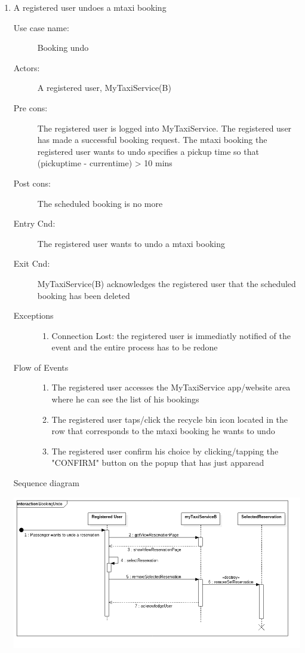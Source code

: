 \documentclass[11pt,titlepage]{article} %
\begin{document}
\begin{enumerate}
	
	       \item A registered user undoes a mtaxi booking
		\begin{description}
		        \item [Use case name:] Booking undo
		        \item [Actors:] A registered user, MyTaxiService(B)
		        \item [Pre cons:] The registered user is logged into MyTaxiService. The registered user
		        has made a successful booking request. The mtaxi booking the registered user wants to undo
		        specifies a pickup time so that (pickuptime - currentime) > 10 mins
		        \item [Post cons:] The scheduled booking is no more
		        \item [Entry Cnd:] The registered user wants to undo a mtaxi booking
		        \item [Exit Cnd:] MyTaxiService(B) acknowledges the registered user that the scheduled booking
		        has been deleted
		        \item [Exceptions]\hfill
			\begin{enumerate}
			          \item Connection Lost: the registered user is immediatly notified of the event and the entire process
			          has to be redone
			\end{enumerate}
		        \item [Flow of Events]\hfill
			\begin{enumerate}
			          \item The registered user accesses the MyTaxiService app/website area where he can see the list of his bookings
			          \item The registered user taps/click the recycle bin icon located in the row that corresponds to the mtaxi booking
			          he wants to undo
			          \item The registered user confirm his choice by clicking/tapping the "CONFIRM" button on
			          the popup that has just apparead
			\end{enumerate}
		\end{description}
		Sequence diagram
		\begin{center}
		\includegraphics[scale=0.52]{usecase9.png}
		\end{center}
	

\end{enumerate}
\end{document}
